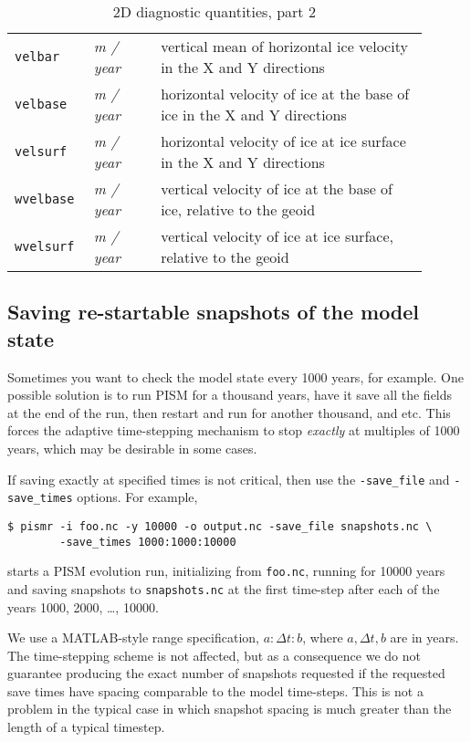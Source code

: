 \begin{table}[ht]
\begin{tabular}{p{0.15\linewidth}p{0.15\linewidth}p{0.6\linewidth}}
    \texttt{velbar} & \textsl{m / year} &  vertical mean of horizontal ice velocity in the X and Y directions \\
    \texttt{velbase} & \textsl{m / year} &  horizontal velocity of ice at the base of ice in the X and Y directions\\
    \texttt{velsurf} & \textsl{m / year} &  horizontal velocity of ice at ice surface in the X and Y directions\\
    \texttt{wvelbase} & \textsl{m / year} &  vertical velocity of ice at the base of ice, relative to the geoid \\
    \texttt{wvelsurf} & \textsl{m / year} &  vertical velocity of ice at ice surface, relative to the geoid \\
  \bottomrule
  \end{tabular}
  \caption{2D diagnostic quantities, part 2}
  \label{tab:two-d-diagnostics-2}
\end{table}


\subsection{Saving re-startable snapshots of the model state}
\label{sec:snapshots}
Sometimes you want to check the model state every 1000 years, for example.  One possible solution is to run PISM for a thousand years, have it save all the fields at the end of the run, then restart and run for another thousand, and etc.  This forces the adaptive time-stepping mechanism to stop \emph{exactly} at multiples of 1000 years, which may be desirable in some cases.

If saving exactly at specified times is not critical, then use the \texttt{-save_file} and \texttt{-save_times} options.  For example,
\begin{verbatim}
$ pismr -i foo.nc -y 10000 -o output.nc -save_file snapshots.nc \
        -save_times 1000:1000:10000
\end{verbatim}
starts a PISM evolution run, initializing from \texttt{foo.nc}, running for
10000 years and saving snapshots to \texttt{snapshots.nc} at the first time-step
after each of the years 1000, 2000, \dots, 10000.

We use a MATLAB-style range specification, $a:\Delta t:b$, where $a,\Delta t,b$ are in years.  The time-stepping scheme is not affected, but as a consequence we do not guarantee producing the exact number of snapshots requested if the requested save times have spacing comparable to the model time-steps.  This is not a problem in the typical case in which snapshot spacing is much greater than the length of a typical timestep.


